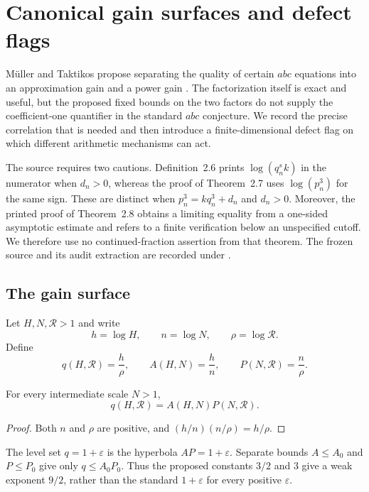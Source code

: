 \section{Canonical gain surfaces and defect flags}
\label{sec:canonical-gain-surface}

M\"uller and Taktikos propose separating the quality of certain $abc$
equations into an approximation gain and a power gain
\cite{MuellerTaktikos2026}.  The factorization itself is exact and useful, but
the proposed fixed bounds on the two factors do not supply the coefficient-one quantifier
in the standard $abc$ conjecture.  We record the precise correlation that is
needed and then introduce a finite-dimensional defect flag on which different
arithmetic mechanisms can act.

The source requires two cautions.  Definition~2.6 prints
$\log(q_n^s k)$ in the numerator when $d_n>0$, whereas the proof of
Theorem~2.7 uses $\log(p_n^3)$ for the same sign.  These are distinct when
$p_n^3=kq_n^3+d_n$ and $d_n>0$.  Moreover, the printed proof of
Theorem~2.8 obtains a limiting equality from a one-sided asymptotic estimate
and refers to a finite verification below an unspecified cutoff.  We therefore
use no continued-fraction assertion from that theorem.  The frozen source and
its audit extraction are recorded under
.

\subsection{The gain surface}

Let $H,N,\mathcal R>1$ and write
\[
 h=\log H,\qquad n=\log N,\qquad \rho=\log \mathcal R.
\]
Define
\[
 q(H,\mathcal R)=\frac{h}{\rho},\qquad
 A(H,N)=\frac{h}{n},\qquad
 P(N,\mathcal R)=\frac{n}{\rho}.
\]

\begin{proposition}
\label{prop:exact-gain-surface}
For every intermediate scale $N>1$,
\[
q(H,\mathcal R)=A(H,N)P(N,\mathcal R).
\]
\end{proposition}

\begin{proof}
Both $n$ and $\rho$ are positive, and
$(h/n)(n/\rho)=h/\rho$.
\end{proof}

The level set $q=1+\varepsilon$ is the hyperbola
$AP=1+\varepsilon$.  Separate bounds $A\le A_0$ and $P\le P_0$
give only $q\le A_0P_0$.  Thus the proposed constants $3/2$ and $3$
give a weak exponent $9/2$, rather than the standard $1+\varepsilon$
for every positive $\varepsilon$.

